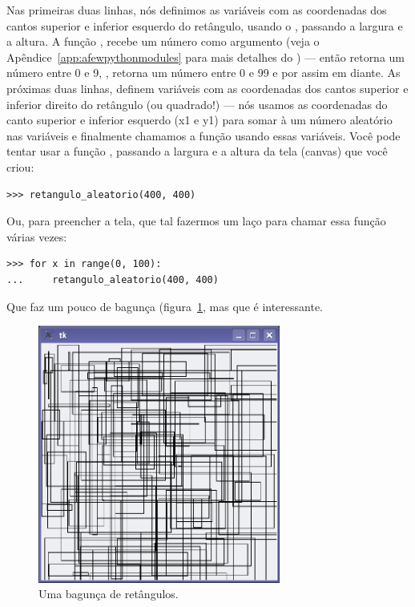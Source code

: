 Nas primeiras duas linhas, nós definimos as variáveis com as coordenadas dos cantos superior e inferior esquerdo do retângulo, usando o , passando a largura e a altura. A função , recebe um número como argumento (veja o Apêndice~\ref{app:afewpythonmodules} para mais detalhes do ) --- então  retorna um número entre 0 e 9, , retorna um número entre 0 e 99 e por assim em diante. As próximas duas linhas, definem variáveis com as coordenadas dos cantos superior e inferior direito do retângulo (ou quadrado!) --- nós usamos as coordenadas do canto superior e inferior esquerdo (x1 e y1) para somar à um número aleatório nas variáveis e finalmente chamamos a função  usando essas variáveis. Você pode tentar usar a função , passando a largura e a altura da tela (canvas) que você criou:

\begin{listing}
\begin{verbatim}
>>> retangulo_aleatorio(400, 400)
\end{verbatim}
\end{listing}

\noindent
Ou, para preencher a tela, que tal fazermos um laço para chamar essa função várias vezes:

\begin{listing}
\begin{verbatim}
>>> for x in range(0, 100):
...     retangulo_aleatorio(400, 400)
\end{verbatim}
\end{listing}

\noindent
Que faz um pouco de bagunça (figura~\ref{fig34}, mas que é interessante.

\begin{figure}
\begin{center}
\includegraphics[width=80mm]{eps/figure34.eps}
\end{center}
\caption{Uma bagunça de retângulos.}\label{fig34}
\end{figure}

